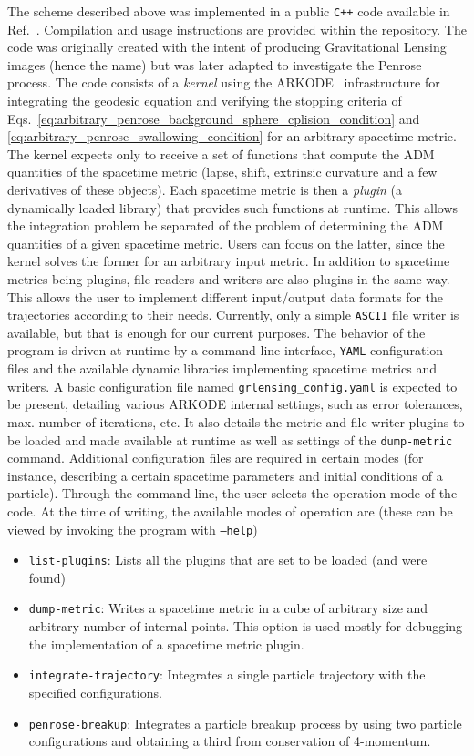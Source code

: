 The scheme described above was implemented in a public \texttt{C++} code available in Ref.~\cite{GRLensingRepo}. Compilation and usage instructions are provided within the repository. The code was originally created with the intent of producing Gravitational Lensing images (hence the name) but was later adapted to investigate the Penrose process. The code consists of a \emph{kernel} using the ARKODE~\cite{ARKODE} infrastructure for integrating the geodesic equation and verifying the stopping criteria of Eqs.~\eqref{eq:arbitrary_penrose_background_sphere_cplision_condition} and \eqref{eq:arbitrary_penrose_swallowing_condition} for an arbitrary spacetime metric. The kernel expects only to receive a set of functions that compute the ADM quantities of the spacetime metric (lapse, shift, extrinsic curvature and a few derivatives of these objects). Each spacetime metric is then a \emph{plugin} (a dynamically loaded library) that provides such functions at runtime. This allows the integration problem be separated of the problem of determining the ADM quantities of a given spacetime metric. Users can focus on the latter, since the kernel solves the former for an arbitrary input metric. In addition to spacetime metrics being plugins, file readers and writers are also plugins in the same way. This allows the user to implement different input/output data formats for the trajectories according to their needs. Currently, only a simple \texttt{ASCII} file writer is available, but that is enough for our current purposes. The behavior of the program is driven at runtime by a command line interface, \texttt{YAML} configuration files and the available dynamic libraries implementing spacetime metrics and writers. A basic configuration file named \texttt{grlensing\_config.yaml} is expected to be present, detailing various ARKODE internal settings, such as error tolerances, max. number of iterations, etc. It also details the metric and file writer plugins to be loaded and made available at runtime as well as settings of the \texttt{dump-metric} command. Additional configuration files are required in certain modes (for instance, describing a certain spacetime parameters and initial conditions of a particle). Through the command line, the user selects the operation mode of the code. At the time of writing, the available modes of operation are (these can be viewed by invoking the program with \texttt{--help})
%
\begin{itemize}
  \item \texttt{list-plugins}: Lists all the plugins that are set to be loaded (and were found)
  \item \texttt{dump-metric}: Writes a spacetime metric in a cube of arbitrary size and arbitrary number of internal points. This option is used mostly for debugging the implementation of a spacetime metric plugin.
  \item \texttt{integrate-trajectory}: Integrates a single particle trajectory with the specified configurations.
  \item \texttt{penrose-breakup}: Integrates a particle breakup process by using two particle configurations and obtaining a third from conservation of 4-momentum.
\end{itemize}
